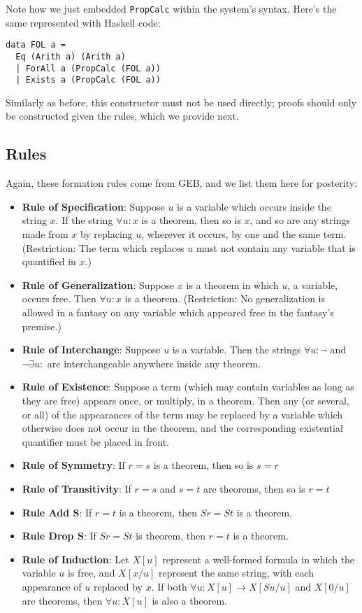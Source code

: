 \documentclass{article}
\begin{document}
Note how we just embedded \texttt{PropCalc} within the system's syntax. Here's the same represented with Haskell code:

\begin{lstlisting}
data FOL a =
  Eq (Arith a) (Arith a)
  | ForAll a (PropCalc (FOL a))
  | Exists a (PropCalc (FOL a))
\end{lstlisting}

Similarly as before, this constructor must not be used directly; proofs should only be constructed given the rules, which we provide next.

\subsection{Rules}

Again, these formation rules come from GEB, and we list them here for posterity:

\begin{itemize}
\item \textbf{Rule of Specification}: Suppose $u$ is a variable which occurs inside the string $x$. If the string $\forall u:x$ is a theorem, then so is $x$, and so are any strings made from $x$ by replacing $u$, wherever it occurs, by one and the same term. (Restriction: The term which replaces $u$ must not contain any variable that is quantified in $x$.)
\item \textbf{Rule of Generalization}: Suppose $x$ is a theorem in which $u$, a variable, occurs free. Then $\forall u:x$ is a theorem. (Restriction: No generalization is allowed in a fantasy on any variable which appeared free in the fantasy's premise.)
\item \textbf{Rule of Interchange}: Suppose $u$ is a variable. Then the strings $\forall u:\neg$ and $\neg \exists u:$ are interchangeable anywhere inside any theorem.
\item \textbf{Rule of Existence}: Suppose a term (which may contain variables as long as they are free) appears once, or multiply, in a theorem. Then any (or several, or all) of the appearances of the term may be replaced by a variable which otherwise does not occur in the theorem, and the corresponding existential quantifier must be placed in front.
\item \textbf{Rule of Symmetry}: If $r=s$ is a theorem, then so is $s=r$
\item \textbf{Rule of Transitivity}: If $r=s$ and $s=t$ are theorems, then so is $r=t$
\item \textbf{Rule Add S}: If $r=t$ is a theorem, then $Sr=St$ is a theorem.
\item \textbf{Rule Drop S}: If $Sr=St$ is theorem, then $r=t$ is a theorem.
\item \textbf{Rule of Induction}: Let $X[u]$ represent a well-formed formula in which the variable $u$ is free, and $X[x/u]$ represent the same string, with each appearance of $u$ replaced by $x$. If both $\forall u:X[u] \to X[Su/u]$ and $X[0/u]$ are theorems, then $\forall u:X[u]$ is also a theorem.
\end{itemize}
\end{document}
